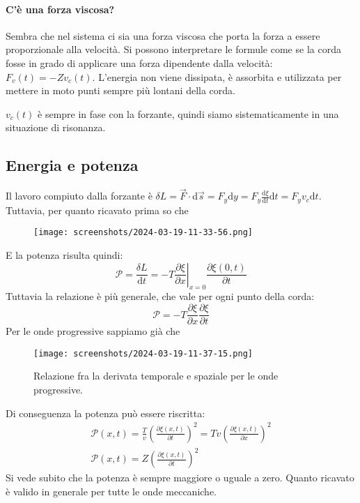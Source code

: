 \paragraph{C'è una forza viscosa?}

Sembra che nel sistema ci sia una forza viscosa che porta la forza a essere proporzionale alla velocità. Si possono interpretare le formule come se la corda fosse in grado di applicare una forza dipendente dalla velocità: \(F_v(t) = -Z v_c(t)\). L'energia non viene dissipata, è assorbita e utilizzata per mettere in moto punti sempre più lontani della corda.

\begin{note}
	\(v_c(t)\) è sempre in fase con la forzante, quindi siamo sistematicamente in una situazione di risonanza.
\end{note}

\subsection{Energia e potenza}

Il lavoro compiuto dalla forzante è \(\delta L = \vec{F} \cdot \mathrm{d} \vec{s} = F_y \mathrm{d} y = F_y \frac{\mathrm{d}\xi }{\mathrm{d}t} \mathrm{d} t = F_y v_c \mathrm{d} t \). Tuttavia, per quanto ricavato prima so che

\begin{figure}[H]
	\centering
	\texttt{[image: screenshots/2024-03-19-11-33-56.png]}
\end{figure}

E la potenza risulta quindi:
\[
	\mathcal{P} = \frac{\delta L}{\mathrm{d} t} = -T \left. \frac{\partial \xi }{\partial x} \right\vert_{x=0} \frac{\partial \xi (0,t)}{\partial t} 
\]
Tuttavia la relazione è più generale, che vale per ogni punto della corda:
\[
	\mathcal{P} = -T \frac{\partial \xi }{\partial x} \frac{\partial \xi }{\partial t}
\]
Per le onde progressive sappiamo già che 
\begin{figure}[H]
	\centering
	\texttt{[image: screenshots/2024-03-19-11-37-15.png]}
	\caption{Relazione fra la derivata temporale e spaziale per le onde progressive.}
	\label{fig:dt-dx-onda-prog}
\end{figure}
Di conseguenza la potenza può essere riscritta:
\begin{gather*}
	\mathcal{P} (x,t) = \frac{T}{v}\left(\frac{\partial \xi (x,t)}{\partial t}\right)^{2}  = Tv\left(\frac{\partial \xi (x,t)}{\partial x} \right)^{2} \\
	\mathcal{P} (x,t) = Z \left(\frac{\partial \xi (x,t)}{\partial t}\right)^{2}
\end{gather*}
Si vede subito che la potenza è sempre maggiore o uguale a zero. Quanto ricavato è valido in generale per tutte le onde meccaniche.

